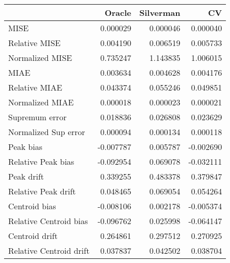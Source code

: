 \begin{tabular}{lrrr}
  \toprule
 & Oracle & Silverman & CV \\ 
  \midrule
MISE & 0.000029 & 0.000046 & 0.000040 \\ 
  Relative MISE & 0.004190 & 0.006519 & 0.005733 \\ 
  Normalized MISE & 0.735247 & 1.143835 & 1.006015 \\ 
  MIAE & 0.003634 & 0.004628 & 0.004176 \\ 
  Relative MIAE & 0.043374 & 0.055246 & 0.049851 \\ 
  Normalized MIAE & 0.000018 & 0.000023 & 0.000021 \\ 
  Supremum error & 0.018836 & 0.026808 & 0.023629 \\ 
  Normalized Sup error & 0.000094 & 0.000134 & 0.000118 \\ 
  Peak bias & -0.007787 & 0.005787 & -0.002690 \\ 
  Relative Peak bias & -0.092954 & 0.069078 & -0.032111 \\ 
  Peak drift & 0.339255 & 0.483378 & 0.379847 \\ 
  Relative Peak drift & 0.048465 & 0.069054 & 0.054264 \\ 
  Centroid bias & -0.008106 & 0.002178 & -0.005374 \\ 
  Relative Centroid bias & -0.096762 & 0.025998 & -0.064147 \\ 
  Centroid drift & 0.264861 & 0.297512 & 0.270925 \\ 
  Relative Centroid drift & 0.037837 & 0.042502 & 0.038704 \\ 
   \bottomrule
\end{tabular}

